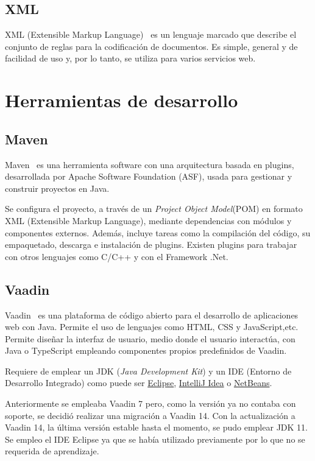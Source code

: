 \subsection{XML}
XML (Extensible Markup Language)~\cite{pagina_xml} es un lenguaje marcado que describe el conjunto de reglas para la codificación de documentos. Es simple, general y de facilidad de uso y, por lo tanto, se utiliza para varios servicios web.

\section{Herramientas de desarrollo}
\subsection{Maven}
Maven~\cite{pagina_maven} es una herramienta software con una arquitectura basada en plugins, desarrollada por Apache Software Foundation (ASF), usada para gestionar y construir proyectos en Java. 

Se configura el proyecto, a través de un \emph{Project Object Model}(POM) en formato XML (Extensible Markup Language), mediante dependencias con módulos y componentes externos. Además, incluye tareas como la compilación del código, su empaquetado, descarga e instalación de plugins. Existen plugins para trabajar con otros lenguajes como C/C++ y con el Framework .Net. 

\subsection{Vaadin}
Vaadin~\cite{pagina_vaadin} es una plataforma de código abierto para el desarrollo de aplicaciones web con Java. Permite el uso de lenguajes como HTML, CSS y JavaScript,etc. Permite diseñar la interfaz de usuario, medio donde el usuario interactúa, con Java o TypeScript empleando componentes propios predefinidos de Vaadin.

Requiere de emplear un JDK (\textit{Java Development Kit}) y un IDE (Entorno de Desarrollo Integrado) como puede ser \href{https://www.eclipse.org/downloads/}{Eclipse}, \href{https://www.jetbrains.com/es-es/idea/}{IntelliJ Idea} o \href{https://netbeans.apache.org/}{NetBeans}.

Anteriormente se empleaba Vaadin 7 pero, como la versión ya no contaba con soporte, se decidió realizar una migración a Vaadin 14. Con la actualización a Vaadin 14, la última versión estable hasta el momento, se pudo emplear JDK 11. Se empleo el IDE Eclipse ya que se había utilizado previamente por lo que no se requerida de aprendizaje.

